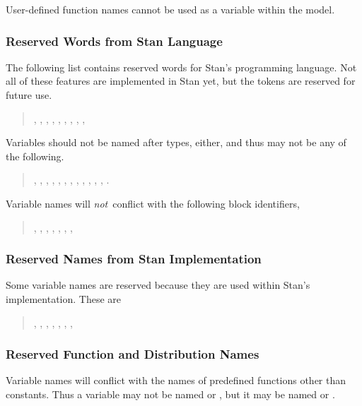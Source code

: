 User-defined function names cannot be used as a variable within the
model.

\subsubsection{Reserved Words from Stan Language}

The following list contains reserved words for Stan's programming
language.  Not all of these features are implemented in Stan yet, but
the tokens are reserved for future use.
%
\begin{quote}
,
,
,
,
,
,
,
,
,
\end{quote}
%
Variables should not be named after types, either, and thus may not be
any of the following.
%
\begin{quote}
,
,
,
,
,
,
,
,
,
,
,
,
.
\end{quote}
%
Variable names will {\it not}\ conflict with the following block identifiers,
%
\begin{quote}
,
,
,
,
,
,
,
\end{quote}
%

\subsubsection{Reserved Names from Stan Implementation}

Some variable names are reserved because they are used within
Stan's \Cpp implementation.  These are
%
\begin{quote}
,
,
,
,
,
,
,
\end{quote}
%

\subsubsection{Reserved Function and Distribution Names}

Variable names will conflict with the names of predefined functions
other than constants.  Thus a variable may not be named 
or , but it may be named  or .

